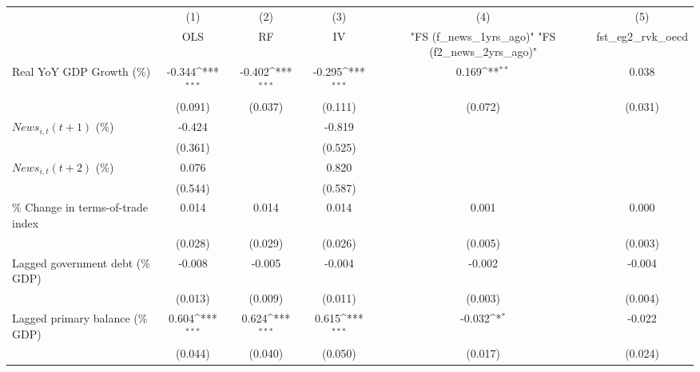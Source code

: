 {
\def\sym#1{\ifmmode^{#1}\else\(^{#1}\)\fi}
\begin{tabular}{l*{5}{c}}
\toprule
                    &\multicolumn{1}{c}{(1)}&\multicolumn{1}{c}{(2)}&\multicolumn{1}{c}{(3)}&\multicolumn{1}{c}{(4)}&\multicolumn{1}{c}{(5)}\\
                    &\multicolumn{1}{c}{OLS}&\multicolumn{1}{c}{RF}&\multicolumn{1}{c}{IV}&\multicolumn{1}{c}{ "FS (f_news_1yrs_ago)"  "FS (f2_news_2yrs_ago)" }&\multicolumn{1}{c}{fst_eg2_rvk_oecd}\\
\midrule
Real YoY GDP Growth (\%)&      -0.344\sym{***}&      -0.402\sym{***}&      -0.295\sym{***}&       0.169\sym{**} &       0.038         \\
                    &     (0.091)         &     (0.037)         &     (0.111)         &     (0.072)         &     (0.031)         \\
\addlinespace
$ News_{i,t}(t+1)$ (\%)&      -0.424         &                     &      -0.819         &                     &                     \\
                    &     (0.361)         &                     &     (0.525)         &                     &                     \\
\addlinespace
$ News_{i,t}(t+2)$ (\%)&       0.076         &                     &       0.820         &                     &                     \\
                    &     (0.544)         &                     &     (0.587)         &                     &                     \\
\addlinespace
\% Change in terms-of-trade index&       0.014         &       0.014         &       0.014         &       0.001         &       0.000         \\
                    &     (0.028)         &     (0.029)         &     (0.026)         &     (0.005)         &     (0.003)         \\
\addlinespace
Lagged government debt (\% GDP)&      -0.008         &      -0.005         &      -0.004         &      -0.002         &      -0.004         \\
                    &     (0.013)         &     (0.009)         &     (0.011)         &     (0.003)         &     (0.004)         \\
\addlinespace
Lagged primary balance (\% GDP)&       0.604\sym{***}&       0.624\sym{***}&       0.615\sym{***}&      -0.032\sym{*}  &      -0.022         \\
                    &     (0.044)         &     (0.040)         &     (0.050)         &     (0.017)         &     (0.024)         \\

\end{tabular}}
